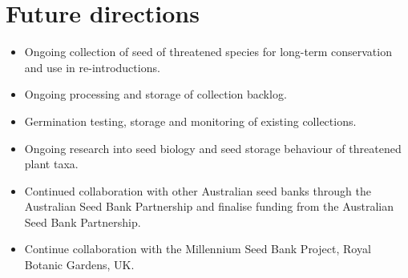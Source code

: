 \documentclass[version=last,
    paper=a4, %
    10pt, %
    usenames,
    dvipsnames,
    oneside, %
    headings=openany, %
    DIV=15 %
]{scrbook}
\begin{document}
\section*{Future directions}
\begin{itemize}
\itemsep1pt\parskip0pt
\item
  Ongoing collection of seed of threatened species for long-term
  conservation and use in re-introductions.
\item
  Ongoing processing and storage of collection backlog.
\item
  Germination testing, storage and monitoring of existing collections.
\item
  Ongoing research into seed biology and seed storage behaviour of
  threatened plant taxa.
\item
  Continued collaboration with other Australian seed banks through the
  Australian Seed Bank Partnership and finalise funding from the
  Australian Seed Bank Partnership.
\item
  Continue collaboration with the Millennium Seed Bank Project, Royal
  Botanic Gardens, UK.
\end{itemize}



\end{document}
